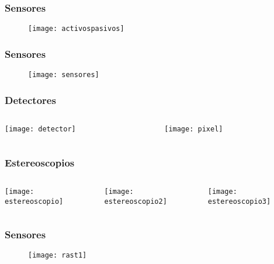 \documentclass{beamer}
\begin{document}
\begin{frame}
\frametitle{Sensores}
  \begin{figure}
    \centering
    \texttt{[image: activospasivos]}
  \end{figure}
\end{frame}
\begin{frame}
\frametitle{Sensores} 
 \begin{figure}
    \centering
    \texttt{[image: sensores]}
  \end{figure}
\end{frame}
\begin{frame}
\frametitle{Detectores}
  \begin{columns}
		\begin{column}{.3\linewidth}
		 \texttt{[image: detector]}
		\end{column}
		\begin{column}{.7\linewidth}
\texttt{[image: pixel]}
		\end{column}
	\end{columns}
\end{frame}
\begin{frame}
\frametitle{Estereoscopios}
  \begin{columns}
		\begin{column}{.3\linewidth}
		 \texttt{[image: estereoscopio]}
		\end{column}
		\begin{column}{.3\linewidth}
\texttt{[image: estereoscopio2]}
		\end{column}
		\begin{column}{.3\linewidth}
\texttt{[image: estereoscopio3]}
		\end{column}
	\end{columns}
\end{frame}
\begin{frame}
\frametitle{Sensores} 
 \begin{figure}
    \centering
    \texttt{[image: rast1]}
  \end{figure}
\end{frame}
\end{document}
